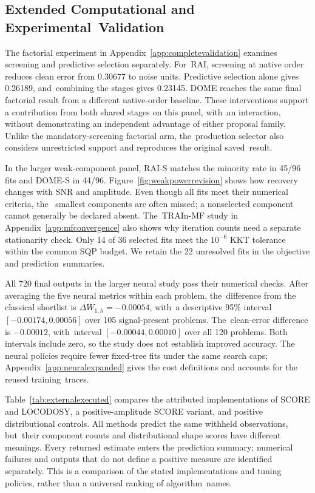 \documentclass[mathematics,article,accept,moreauthors]{Definitions/mdpi}
\begin{document}
\subsection{Extended Computational and Experimental~Validation}\label{sec:extendedresults}
The factorial experiment in Appendix~\ref{app:completevalidation} examines
screening and predictive selection separately. For~RAI, screening at native order
reduces clean error from 0.30677 to noise units. Predictive selection alone
gives 0.26189, and~combining the stages gives 0.23145. DOME reaches the same final
factorial result from a different native-order baseline. These interventions
support a contribution from both shared stages on this panel, with~an interaction,
without demonstrating an independent advantage of either proposal family. Unlike
the mandatory-screening factorial arm, the~production selector also considers
unrestricted support and reproduces the original saved~result.

In the larger weak-component panel, RAI-S matches the minority rate in 45/96 fits
and DOME-S in 44/96. Figure~\ref{fig:weakpowerrevision} shows how recovery changes
with SNR and amplitude. Even though all fits meet their numerical criteria, the~
smallest components are often missed; a nonselected component cannot generally be
declared absent. The~TRAIn-MF study in Appendix~\ref{app:mfconvergence} also shows
why iteration counts need a separate stationarity check. Only 14 of 36 selected
fits meet the $10^{-6}$ KKT tolerance within the common SQP budget. We retain the
22 unresolved fits in the objective and prediction~summaries.

All 720 final outputs in the larger neural study pass their numerical checks.
After averaging the five neural metrics within each problem, the~difference
from the classical shortlist is $\Delta W_{1,h}=-0.00054$, with~a descriptive
95\% interval $[-0.00174,0.00056]$ over 105 signal-present problems. The~clean-error
difference is $-0.00012$, with~interval $[-0.00044,0.00010]$ over all 120 problems.
Both intervals include zero, so the study does not establish improved accuracy.
The neural policies require fewer fixed-tree fits under the same search caps;
Appendix~\ref{app:neuralexpanded} gives the cost definitions and accounts for the
reused training~traces.

Table~\ref{tab:externalexecuted} compares the attributed implementations of SCORE and LOCODOSY, a positive-amplitude SCORE variant, and positive distributional controls. All methods predict the same withheld observations, but~their component
counts and distributional shape scores have different meanings. Every returned
estimate enters the prediction summary; numerical failures and outputs that do
not define a positive measure are identified separately. This is a comparison of
the stated implementations and tuning policies, rather than a universal ranking
of algorithm~names.
\end{document}
